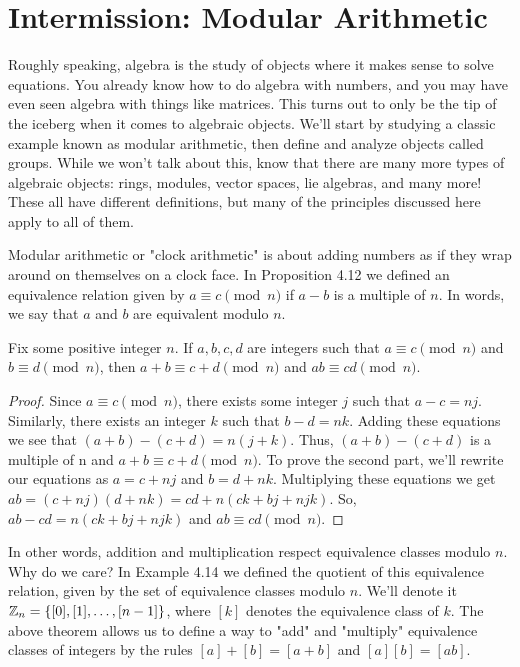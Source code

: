 \documentclass[../main.tex]{subfiles}
\begin{document}
\section{Intermission: Modular Arithmetic} \label{sec:mods}
Roughly speaking, algebra is the study of objects where it makes sense to solve equations. You already know how to do algebra with numbers, and you may have even seen algebra with things like matrices. This turns out to only be the tip of the iceberg when it comes to algebraic objects. We'll start by studying a classic example known as modular arithmetic, then define and analyze objects called groups. While we won't talk about this, know that there are many more types of algebraic objects: rings, modules, vector spaces, lie algebras, and many more! These all have different definitions, but many of the principles discussed here apply to all of them.
 
 Modular arithmetic or "clock arithmetic" is about adding numbers as if they wrap around on themselves on a clock face. In Proposition 4.12 we defined an equivalence relation given by $a \equiv c \pmod{n}$ if $a-b$ is a multiple of $n$. In words, we say that $a$ and $b$ are equivalent modulo $n$.
 
 \begin{theorem}
 Fix some positive integer $n$. If $a,b,c,d$ are integers such that $a \equiv c \pmod{n}$ and $b \equiv d \pmod{n}$, then $a+b \equiv c+d \pmod{n}$ and $ab \equiv cd \pmod{n}$.
 \end{theorem}

\begin{proof}
Since $a \equiv c \pmod{n}$, there exists some integer $j$ such that $a-c=nj$. Similarly, there exists an integer $k$ such that $b-d=nk$. Adding these equations we see that $(a+b)-(c+d)=n(j+k)$. Thus, $(a+b)-(c+d)$ is a multiple of n and $a+b \equiv c+d \pmod{n}$. To prove the second part, we'll rewrite our equations as $a=c+nj$ and $b=d+nk$. Multiplying these equations we get $ab=(c+nj)(d+nk)=cd+n(ck+bj+njk)$. So, $ab-cd=n(ck+bj+njk)$ and $ab \equiv cd \pmod{n}$.
\end{proof}

In other words, addition and multiplication respect equivalence classes modulo $n$. Why do we care? In Example 4.14 we defined the quotient of this equivalence relation, given by the set of equivalence classes modulo $n$. We'll denote it $\mathbb Z_n=\{[0],[1],\dots,[n-1]\}$, where $[k]$ denotes the equivalence class of $k$. The above theorem allows us to define a way to "add" and "multiply" equivalence classes of integers by the rules $[a]+[b]=[a+b]$ and $[a][b]=[ab]$.
\end{document}
